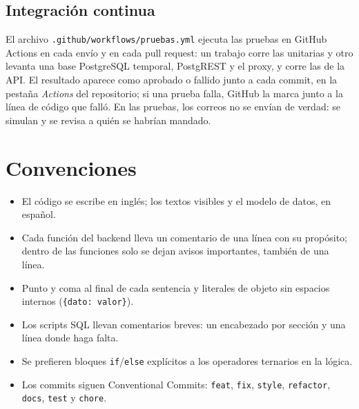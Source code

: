 \documentclass[11pt,letterpaper]{article}
\newcommand{\code}[1]{\nolinkurl{#1}}
\begin{document}
\subsection{Integración continua}
El archivo \code{.github/workflows/pruebas.yml} ejecuta las pruebas en GitHub Actions en cada envío y en cada pull request: un trabajo corre las unitarias y otro levanta una base PostgreSQL temporal, PostgREST y el proxy, y corre las de la API. El resultado aparece como aprobado o fallido junto a cada commit, en la pestaña \emph{Actions} del repositorio; si una prueba falla, GitHub la marca junto a la línea de código que falló. En las pruebas, los correos no se envían de verdad: se simulan y se revisa a quién se habrían mandado.

\section{Convenciones}
\begin{itemize}
  \item El código se escribe en inglés; los textos visibles y el modelo de datos, en español.
  \item Cada función del backend lleva un comentario de una línea con su propósito; dentro de las funciones solo se dejan avisos importantes, también de una línea.
  \item Punto y coma al final de cada sentencia y literales de objeto sin espacios internos (\texttt{\{dato: valor\}}).
  \item Los scripts SQL llevan comentarios breves: un encabezado por sección y una línea donde haga falta.
  \item Se prefieren bloques \code{if}/\code{else} explícitos a los operadores ternarios en la lógica.
  \item Los commits siguen Conventional Commits: \code{feat}, \code{fix}, \code{style}, \code{refactor}, \code{docs}, \code{test} y \code{chore}.
\end{itemize}
\end{document}
